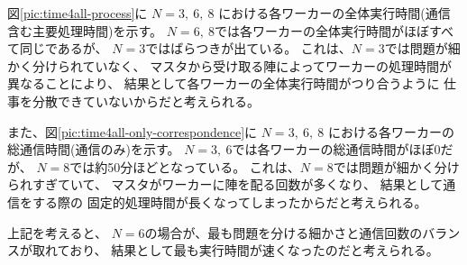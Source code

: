 図\ref{pic:time4all-process}に
$N=3, \ 6, \ 8$
における各ワーカーの全体実行時間(通信含む主要処理時間)を示す。
$N=6, \  8$では各ワーカーの全体実行時間がほぼすべて同じであるが、
$N=3$ではばらつきが出ている。
これは、$N=3$では問題が細かく分けられていなく、
マスタから受け取る陣によってワーカーの処理時間が異なることにより、
結果として各ワーカーの全体実行時間がつり合うように
仕事を分散できていないからだと考えられる。

また、図\ref{pic:time4all-only-correspondence}に
$N=3, \ 6, \ 8$
における各ワーカーの総通信時間(通信のみ)を示す。
$N=3, \ 6$では各ワーカーの総通信時間がほぼ0だが、
$N=8$では約50分ほどとなっている。
これは、$N=8$では問題が細かく分けられすぎていて、
マスタがワーカーに陣を配る回数が多くなり、
結果として通信をする際の
固定的処理時間が長くなってしまったからだと考えられる。

上記を考えると、
$N=6$の場合が、最も問題を分ける細かさと通信回数のバランスが取れており、
結果として最も実行時間が速くなったのだと考えられる。

